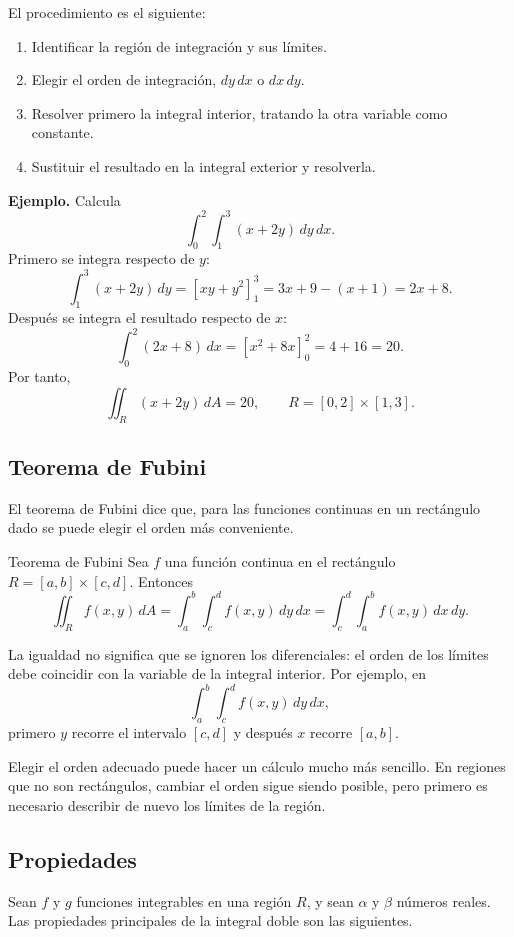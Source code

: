 El procedimiento es el siguiente:
\begin{enumerate}
    \item Identificar la región de integración y sus límites.
    \item Elegir el orden de integración, $dy\,dx$ o $dx\,dy$.
    \item Resolver primero la integral interior, tratando la otra variable como constante.
    \item Sustituir el resultado en la integral exterior y resolverla.
\end{enumerate}

\textbf{Ejemplo.} Calcula
\[
\int_0^2\int_1^3 (x+2y)\,dy\,dx.
\]
Primero se integra respecto de $y$:
\[
\int_1^3(x+2y)\,dy
=\left[xy+y^2\right]_1^3
=3x+9-(x+1)=2x+8.
\]
Después se integra el resultado respecto de $x$:
\[
\int_0^2(2x+8)\,dx
=\left[x^2+8x\right]_0^2
=4+16=20.
\]
Por tanto,
\[
\iint_R(x+2y)\,dA=20,
\qquad
R=[0,2]\times[1,3].
\]

\subsection{Teorema de Fubini}

El teorema de Fubini dice que, para las funciones continuas en un rectángulo dado se puede elegir el orden más conveniente.

\begin{mytheorem}{Teorema de Fubini}
Sea $f$ una función continua en el rectángulo $R=[a,b]\times[c,d]$. Entonces
\[
\iint_R f(x,y)\,dA
=\int_a^b\int_c^d f(x,y)\,dy\,dx
=\int_c^d\int_a^b f(x,y)\,dx\,dy.
\]
\end{mytheorem}

La igualdad no significa que se ignoren los diferenciales: el orden de los límites debe coincidir con la variable de la integral interior. Por ejemplo, en
\[
\int_a^b\int_c^d f(x,y)\,dy\,dx,
\]
primero $y$ recorre el intervalo $[c,d]$ y después $x$ recorre $[a,b]$.

Elegir el orden adecuado puede hacer un cálculo mucho más sencillo. En regiones que no son rectángulos, cambiar el orden sigue siendo posible, pero primero es necesario describir de nuevo los límites de la región.

\subsection{Propiedades}

Sean $f$ y $g$ funciones integrables en una región $R$, y sean $\alpha$ y $\beta$ números reales. Las propiedades principales de la integral doble son las siguientes.

